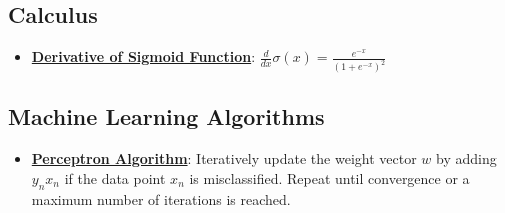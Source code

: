 \documentclass{article}%
\begin{document}
%
\subsection{Calculus}%
\label{subsec:Calculus}%
\begin{itemize}[leftmargin=*]%
\item \href{\url{https://purdue.brightspace.com/d2l/common/assets/pdfjs-d2l-dist/1.0.14-legacy/web/viewer.html?file=\%252Fcontent\%252Fenforced\%252F1095467-wl.202510.CS.24300.001\%252F04L1-Linear\%20Algebra\%20Primer.pdf\%253Fou\%253D1095467\&lang=en-us\&container=d2l-fileviewer-rendered-pdf\&fullscreen=d2l-fileviewer-rendered-pdf-dialog\&height=667}#page=21}{\textbf{Derivative of Sigmoid Function}}: $\frac{d}{dx} \sigma(x) = \frac{e^{-x}}{(1 + e^{-x})^2}$%
\end{itemize}

%
\subsection{Machine Learning Algorithms}%
\label{subsec:MachineLearningAlgorithms}%
\begin{itemize}[leftmargin=*]%
\item \href{\url{https://purdue.brightspace.com/d2l/common/assets/pdfjs-d2l-dist/1.0.14-legacy/web/viewer.html?file=\%252Fcontent\%252Fenforced\%252F1095467-wl.202510.CS.24300.001\%252F05L2-ML\%20Basics.pdf\%253Fou\%253D1095467\&lang=en-us\&container=d2l-fileviewer-rendered-pdf\&fullscreen=d2l-fileviewer-rendered-pdf-dialog\&height=667}#page=30}{\textbf{Perceptron Algorithm}}: Iteratively update the weight vector $w$ by adding $y_nx_n$ if the data point $x_n$ is misclassified. Repeat until convergence or a maximum number of iterations is reached.%
\end{itemize}

%
\end{document}
